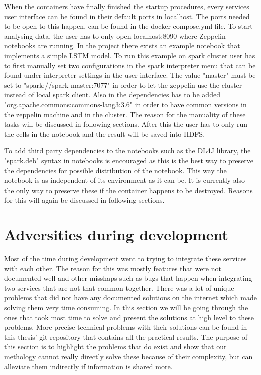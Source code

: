 When the containers have finally finished the startup procedures, every services user interface can be found in their default ports in localhost.
The ports needed to be open to this happen, can be found in the docker-compose.yml file.
To start analysing data, the user has to only open localhost:8090 where Zeppelin notebooks are running.
In the project there exists an example notebook that implements a simple LSTM model.
To run this example on spark cluster user has to first manually set two configurations in the spark interpreter menu that can be found under interpreter settings in the user interface.
The value "master" must be set to "spark://spark-master:7077" in order to let the zeppelin use the cluster instead of local spark client.
Also in the dependencies has to be added "org.apache.commons:commons-lang3:3.6" in order to have common versions in the zeppelin machine and in the cluster.
The reason for the manuality of these tasks will be discussed in following sections.
After this the user has to only run the cells in the notebook and the result will be saved into HDFS.

To add third party dependencies to the notebooks such as the DL4J library, the "spark.deb" syntax in notebooks is encouraged as this is the best way to preserve the dependencies for possible distribution of the notebook.
This way the notebook is as independent of its environment as it can be.
It is currently also the only way to preserve these if the container happens to be destroyed. 
Reasons for this will again be discussed in following sections.

\section{Adversities during development}

Most of the time during development went to trying to integrate these services with each other.
The reason for this was mostly features that were not documented well and other misshaps such as bugs that happen when integrating two services that are not that common together.
There was a lot of unique problems that did not have any documented solutions on the internet which made solving them very time consuming.
In this section we will be going through the ones that took most time to solve and present the solutions at high level to these problems.
More precise technical problems with their solutions can be found in this thesis' git repository that contains all the practical results.
The purpose of this section is to highlight the problems that do exist and show that our methology cannot really directly solve these because of their complexity, but can alleviate them indirectly if information is shared more.

